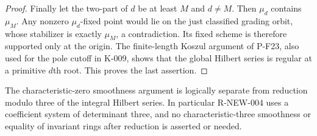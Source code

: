 \begin{proof}
Finally let the two-part of $d$ be at least $M$ and $d\ne M$.
Then $\mu_d$ contains $\mu_M$.  Any nonzero $\mu_d$-fixed point
would lie on the just classified grading orbit, whose stabilizer
is exactly $\mu_M$, a contradiction.  Its fixed scheme is
therefore supported only at the origin.  The finite-length
Koszul argument of P-F23, also used for the pole cutoff in K-009,
shows that the global Hilbert series is regular at a primitive
$d$th root.  This proves the last assertion.
\end{proof}

The characteristic-zero smoothness argument is logically separate
from reduction modulo three of the integral Hilbert series.
In particular R-NEW-004 uses a coefficient system of determinant
three, and no characteristic-three smoothness or equality of
invariant rings after reduction is asserted or needed.
